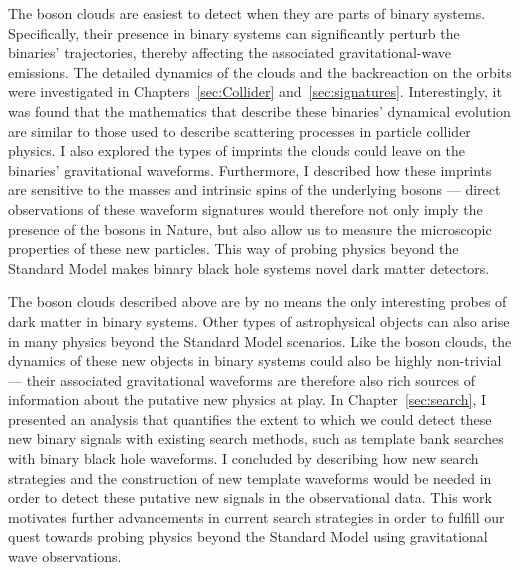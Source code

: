 The boson clouds are easiest to detect when they are parts of binary systems. Specifically, their presence in binary systems can significantly perturb the binaries' trajectories, thereby affecting the associated gravitational-wave emissions. The detailed dynamics of the clouds and the backreaction on the orbits were investigated in Chapters~\ref{sec:Collider} and~\ref{sec:signatures}. Interestingly, it was found that the mathematics that describe these binaries' dynamical evolution are similar to those used to describe scattering processes in particle collider physics. I also explored the types of imprints the clouds could leave on the binaries' gravitational waveforms. Furthermore, I described how these imprints are sensitive to the masses and intrinsic spins of the underlying bosons --- direct observations of these waveform signatures would therefore not only imply the presence of the bosons in Nature, but also allow us to measure the microscopic properties of these new particles. This way of probing physics beyond the Standard Model makes binary black hole systems novel dark matter detectors. 


The boson clouds described above are by no means the only interesting probes of dark matter in binary systems. Other types of astrophysical objects can also arise in many physics beyond the Standard Model scenarios. Like the boson clouds, the dynamics of these new objects in binary systems could also be highly non-trivial ---  their associated gravitational waveforms are therefore also rich sources of information about the putative new physics at play. In Chapter~\ref{sec:search}, I presented an analysis that quantifies the extent to which we could detect these new binary signals with existing search methods, such as template bank searches with binary black hole waveforms. I concluded by describing how new search strategies and the construction of new template waveforms would be needed in order to detect these putative new signals in the observational data. This work motivates further advancements in current search strategies in order to fulfill our quest towards probing physics beyond the Standard Model using gravitational wave observations.

